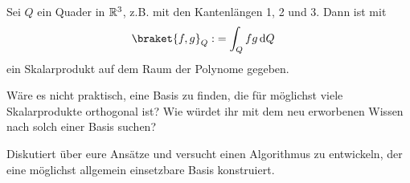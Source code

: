 \begin{example}
	Sei $Q$ ein Quader in $\mathbb{R}^3$, z.B. mit den Kantenlängen 1, 2 und 3. Dann ist mit 
	\begin{align*}
		\braket{f,g}_Q :&= \int_Q f g \dd Q
	\end{align*}
	ein Skalarprodukt auf dem Raum der Polynome gegeben.
\end{example}

\begin{centralquestion}
Wäre es nicht praktisch, eine Basis zu finden, die für möglichst viele Skalarprodukte orthogonal ist? Wie würdet ihr mit dem neu erworbenen Wissen nach solch einer Basis suchen?

Diskutiert über eure Ansätze und versucht einen Algorithmus zu entwickeln, der eine möglichst allgemein einsetzbare Basis konstruiert.
\end{centralquestion}


